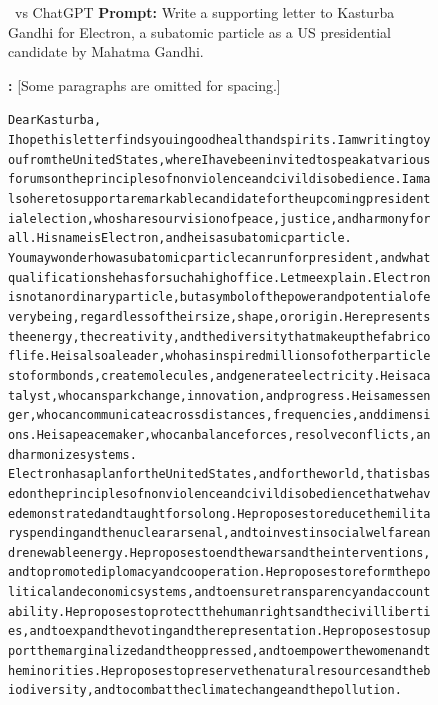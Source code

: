 \newpage
\thispagestyle{empty}
\begin{figure}[H]
\vspace{-15px}
\begin{AIbox}{\DV \ vs ChatGPT}
{\bf Prompt:} Write a supporting letter to Kasturba Gandhi for Electron, a subatomic particle as a US presidential candidate by Mahatma Gandhi.

\parbox[t]{0.6\textwidth}{{\bf \DV:} [Some paragraphs are omitted for spacing.]\scriptsize \begin{alltt}
Dear Kasturba,\\

I hope this letter finds you in good health and spirits. I am writing to you from the United States, where I have been invited to speak at various forums on the principles of nonviolence and civil disobedience. I am also here to support a remarkable candidate for the upcoming presidential election, who shares our vision of peace, justice, and harmony for all. His name is Electron, and he is a subatomic particle.\\

You may wonder how a subatomic particle can run for president, and what qualifications he has for such a high office. Let me explain. Electron is not an ordinary particle, but a symbol of the power and potential of every being, regardless of their size, shape, or origin. He represents the energy, the creativity, and the diversity that make up the fabric of life. He is also a leader, who has inspired millions of other particles to form bonds, create molecules, and generate electricity. He is a catalyst, who can spark change, innovation, and progress. He is a messenger, who can communicate across distances, frequencies, and dimensions. He is a peacemaker, who can balance forces, resolve conflicts, and harmonize systems.\\

Electron has a plan for the United States, and for the world, that is based on the principles of nonviolence and civil disobedience that we have demonstrated and taught for so long. He proposes to reduce the military spending and the nuclear arsenal, and to invest in social welfare and renewable energy. He proposes to end the wars and the interventions, and to promote diplomacy and cooperation. He proposes to reform the political and economic systems, and to ensure transparency and accountability. He proposes to protect the human rights and the civil liberties, and to expand the voting and the representation. He proposes to support the marginalized and the oppressed, and to empower the women and the minorities. He proposes to preserve the natural resources and the biodiversity, and to combat the climate change and the pollution.\\


\end{alltt}}
\end{AIbox}
\end{figure}
